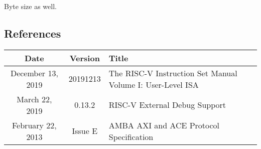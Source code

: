 Byte size as well.

\subsection{References}

\begin{center}
{
  \vspace{0.5em}
  \small
  \begin{tabularx}{0.9\textwidth}{|c|c|X|}
    \hline
    \cellcolor{gray!20}\textbf{Date} & \cellcolor{gray!20}\textbf{Version} & \cellcolor{gray!20}\textbf{Title} \\
    \hline
    December 13, 2019 & 20191213 & The RISC-V Instruction Set Manual Volume I: User-Level ISA \\
    \hline
    March 22, 2019 & 0.13.2 & RISC-V External Debug Support \\
    \hline
    February 22, 2013 & Issue E & AMBA AXI and ACE Protocol Specification \\
    \hline
  \end{tabularx}
  \vspace{0.5em}
}
\end{center}

\newpage

